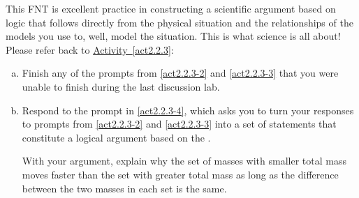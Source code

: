 \label{fnt2.2.3-1}

This FNT is excellent practice in constructing a scientific argument based on logic that follows directly from the physical situation and the relationships of the models you use to, well, model the situation. This is what science is all about!\\

\noindent Please refer back to \hyperref[act2.2.3]{Activity~\ref*{act2.2.3}}:

\begin{enumerate}[(a)]
	\item Finish any of the prompts from \ref{act2.2.3-2} and \ref{act2.2.3-3} that you were unable to finish during the last discussion lab.
	\label{fnt2.2.3-1a}
	
	\item  Respond to the prompt in \ref{act2.2.3-4}, which asks you to turn your responses to prompts from \ref{act2.2.3-2} and \ref{act2.2.3-3} into a set of statements that constitute a logical argument based on the \EnergyInteractionModel{}.
	
		With your argument, explain why the set of masses with smaller total mass moves faster than the set with greater total mass as long as the difference between the two masses in each set is the same.
	\label{fnt2.2.3-1b}
\end{enumerate}